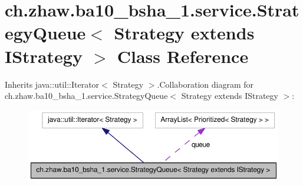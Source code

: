 \hypertarget{classch_1_1zhaw_1_1ba10__bsha__1_1_1service_1_1StrategyQueue_3_01Strategy_01extends_01IStrategy_01_4}{
\section{ch.zhaw.ba10\_\-bsha\_\-1.service.StrategyQueue$<$ Strategy extends IStrategy $>$ Class Reference}
\label{classch_1_1zhaw_1_1ba10__bsha__1_1_1service_1_1StrategyQueue_3_01Strategy_01extends_01IStrategy_01_4}
}


Inherits java::util::Iterator$<$ Strategy $>$.Collaboration diagram for ch.zhaw.ba10\_\-bsha\_\-1.service.StrategyQueue$<$ Strategy extends IStrategy $>$:\nopagebreak
\begin{figure}[H]
\begin{center}
\leavevmode
\includegraphics[width=394pt]{classch_1_1zhaw_1_1ba10__bsha__1_1_1service_1_1StrategyQueue_3_01Strategy_01extends_01IStrategy_01_4__coll__graph}
\end{center}
\end{figure}
